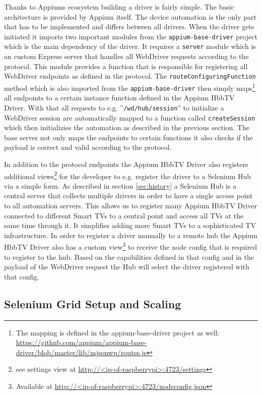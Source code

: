 Thanks to Appiums ecosystem building a driver is fairly simple. The basic architecture is provided by Appium itself. The device automation is the only part that has to be implemented and differs between all drivers. When the driver gets initiated it imports two important modules from the \texttt{appium-base-driver} project which is the main dependency of the driver. It requires a \texttt{server} module which is an custom Express server that handles all WebDriver requests according to the protocol. This module provides a function that is responsible for registering all WebDriver endpoints as defined in the protocol. The \texttt{routeConfiguringFunction} method which is also imported from the \texttt{appium-base-driver} then simply maps\footnote{The mapping is defined in the appium-base-driver project as well: \url{https://github.com/appium/appium-base-driver/blob/master/lib/mjsonwp/routes.js}} all endpoints to a certain instance function defined in the Appium HbbTV Driver. With that all requests to e.g. ''\texttt{/wd/hub/session}'' to initialize a WebDriver session are automatically mapped to a function called \texttt{createSession} which then initializies the automation as described in the previous section. The base server not only maps the endpoints to certain functions it also checks if the payload is correct and valid according to the protocol.

In addition to the protocol endpoints the Appium HbbTV Driver also registers additional views\footnote{see settings view at \url{http://<ip-of-raspberrypi>:4723/settings}} for the developer to e.g. register the driver to a Selenium Hub via a simple form. As described in section \ref{sec:history} a Selenium Hub is a central server that collects multiple drivers in order to have a single access point to all automation servers. This allows us to register many Appium HbbTV Driver connected to different Smart TVs to a central point and access all TVs at the same time through it. It simplifies adding more Smart TVs to a sophisticated TV infrastructure. In order to register a driver manually to a remote hub the Appium HbbTV Driver also has a custom view\footnote{Available at \url{http://<ip-of-raspberrypi>:4723/nodeconfig.json}} to receive the node config that is required to register to the hub. Based on the capabilities defined in that config and in the payload of the WebDriver request the Hub will select the driver registered with that config.

\subsection{Selenium Grid Setup and Scaling\label{sec:setupscaling}}

